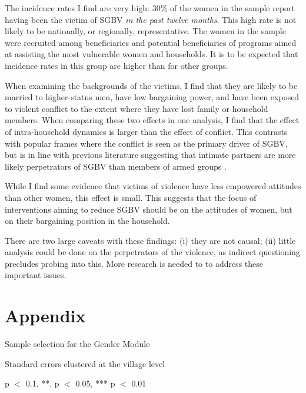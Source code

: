 \documentclass[10pt,a4paper,abstract=on]{scrartcl} %
\begin{document}
The incidence rates I find are very high: 30\% of the women in the sample report having been the victim of SGBV \textit{in the past twelve months}. This high rate is not likely to be nationally, or regionally, representative. The women in the sample were recruited among beneficiaries and potential beneficiaries of programs aimed at assisting the most vulnerable women and households. It is to be expected that incidence rates in this group are higher than for other groups.

When examining the backgrounds of the victims, I find that they are likely to be married to higher-status men, have low bargaining power, and have been exposed to violent conflict to the extent where they have lost family or household members. When comparing these two effects in one analysis, I find that the effect of intra-household dynamics is larger than the effect of conflict. This contrasts with popular frames where the conflict is seen as the primary driver of SGBV, but is in line with previous literature suggesting that intimate partners are more likely perpetrators of SGBV than members of armed groups \citep[see e.g.][]{Peterman2011}. 

While I find some evidence that victims of violence have less empowered attitudes than other women, this effect is small. This suggests that the focus of interventions aiming to reduce SGBV should be on the attitudes of women, but on their bargaining position in the household.

There are two large caveats with these findings: (i) they are not causal; (ii) little analysis could be done on the perpetrators of the violence, as indirect questioning precludes probing into this. More research is needed to  to address these important issues.

\clearpage 



\clearpage
\section*{Appendix}
\setcounter{table}{0}
\renewcommand{\thetable}{A\arabic{table}}

\begin{threeparttable}[htb]
	\caption{Sample selection for the Gender Module}\label{tab:sample_selection}
	\begin{center}
	
	\begin{tablenotes}
	\small
	 \item Standard errors clustered at the village level
	 \item * p $<$ 0.1, **, p $<$ 0.05, *** p $<$ 0.01
	\end{tablenotes}
	\end{center}
\end{threeparttable}
\end{document}
